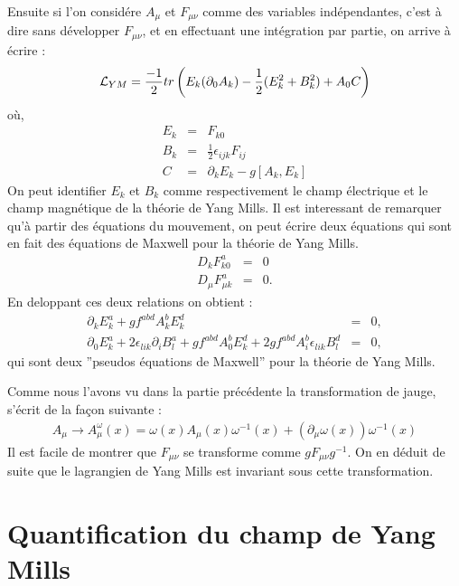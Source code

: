 \documentclass[a4paper,11pt]{article}
\theoremstyle{plain}
\theoremstyle{definition}
\theoremstyle{remark}
\numberwithin{equation}{section}
\numberwithin{equation}{subsection}
\numberwithin{figure}{section}
\begin{document}
Ensuite si l'on considére $A_{\mu}$ et $F_{\mu \nu}$ comme des variables indépendantes, c'est à dire sans développer $F_{\mu \nu}$, 
et en effectuant une intégration par partie, on arrive à écrire :
\begin{eqnarray}
\mathcal{L}_{\small YM} = \frac{-1}{2} tr\left( E_{k}(\partial_{0} A_{k}) - \frac{1}{2}(E_{k}^{2} + B_{k}^2) + A_{0}C\right)
\end{eqnarray}
où,
\begin{eqnarray}
 E_k &=& F_{k0}\\
 B_k &=& \frac{1}{2} \epsilon_{ijk} F_{ij}\\
 C &=& \partial_{k} E_{k} - g[A_k , E_k] 
\end{eqnarray}
On peut identifier $E_k$ et $B_k$ comme respectivement le champ électrique et le champ magnétique de la théorie de Yang Mills. Il est 
interessant de remarquer qu'à partir des équations du mouvement, on peut écrire deux équations qui sont en fait des équations de Maxwell 
pour la théorie de Yang Mills.
\begin{eqnarray}
 D_{k}  F^{a}_{k0}  &=& 0   \\
 D_{\mu} F^{a}_{\mu k} &=& 0.
\end{eqnarray}
En deloppant ces deux relations on obtient :
\begin{eqnarray}
 \partial_{k} E^{a}_{k}  + g f^{abd} A^{b}_{k} E^{d}_{k}  &=& 0,  \\
 \partial_{0} E^{a}_{k} + 2 \epsilon_{lik} \partial_{i} B^{a}_{l} + g f^{abd} A^{b}_{0} E^{d}_{k } 
+ 2 g  f^{abd} A^{b}_{i} \epsilon_{lik} B^{d}_{l } &=& 0,
\end{eqnarray}
qui sont deux ''pseudos équations de Maxwell'' pour la théorie de Yang Mills.
 
\noindent
Comme nous l'avons vu dans la partie précédente la transformation de jauge, s'écrit de la façon suivante :
\begin{eqnarray}
 A_{\mu} \rightarrow  A^{\omega}_{\mu}(x)=\omega(x)A_{\mu}(x)\omega^{-1}(x) + ( \partial_{\mu} \omega(x) ) \omega^{-1}(x)
\end{eqnarray}
Il est facile de montrer que $F_{\mu \nu}$ se transforme comme $g F_{\mu \nu} g^{-1}$. On en déduit de suite que le lagrangien de Yang Mills est invariant sous cette transformation. \\


 \section{Quantification du champ de Yang Mills}
\end{document}
